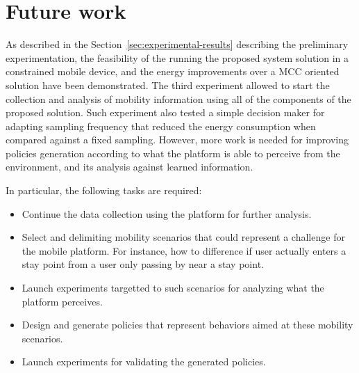 \documentclass[ENG,PhD]{cinvestav}
\begin{document}
 
%                                                                                               
\section{Future work}\label{sec:future-work}
As described in the Section~\ref{sec:experimental-results} describing the preliminary experimentation, the feasibility of the running the proposed system solution in a constrained mobile device, and the energy improvements over a MCC oriented solution have been demonstrated.
The third experiment allowed to start the collection and analysis of mobility information using all of the components of the proposed solution.
Such experiment also tested a simple decision maker for adapting sampling frequency that reduced the energy consumption when compared against a fixed sampling.
However, more work is needed for improving policies generation according to what the platform is able to perceive from the environment, and its analysis against learned information.

In particular, the following tasks are required:
\begin{itemize}
  \item Continue the data collection using the platform for further analysis.
  \item Select and delimiting mobility scenarios that could represent a challenge for the mobile platform.
  For instance, how to difference if user actually enters a stay point from a user only passing by near a stay point.
  \item Launch experiments targetted to such scenarios for analyzing what the platform perceives.
  \item Design and generate policies that represent behaviors aimed at these mobility scenarios.
  \item Launch experiments for validating the generated policies.
\end{itemize}
\end{document}

